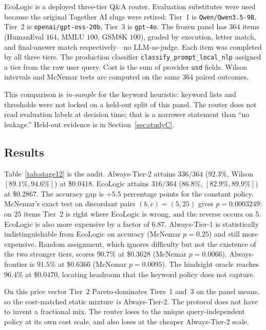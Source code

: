 \documentclass[a4paper,twoside]{article}
\begin{document}
EcoLogic is a deployed three-tier Q\&A router. Evaluation substitutes were used because the original Together AI slugs were retired: Tier~1 is \texttt{Qwen/Qwen3.5-9B}, Tier~2 is \texttt{openai/gpt-oss-20b}, Tier~3 is \texttt{gpt-4o}. The frozen panel has $364$ items (HumanEval $164$, MMLU $100$, GSM8K $100$), graded by execution, letter match, and final-answer match respectively---no LLM-as-judge. Each item was completed by all three tiers. The production classifier \texttt{classify\_prompt\_local\_nlp} assigned a tier from the raw user query. Cost is the sum of provider \texttt{usd} fields. Wilson intervals and McNemar tests are computed on the same $364$ paired outcomes.

This comparison is \emph{in-sample} for the keyword heuristic: keyword lists and thresholds were not locked on a held-out split of this panel. The router does not read evaluation labels at decision time; that is a narrower statement than ``no leakage.'' Held-out evidence is in Section~\ref{sec:studyC}.

\subsection{Results}

Table~\ref{tab:stage12} is the audit. Always-Tier-2 attains $336/364$ ($92.3\%$, Wilson $[89.1\%, 94.6\%]$) at \$0.0418. EcoLogic attains $316/364$ ($86.8\%$, $[82.9\%, 89.9\%]$) at \$0.2867. The accuracy gap is $+5.5$ percentage points for the constant policy. McNemar's exact test on discordant pairs $(b,c)=(5,25)$ gives $p=0.0003249$: on $25$ items Tier~2 is right where EcoLogic is wrong, and the reverse occurs on $5$. EcoLogic is also more expensive by a factor of $6.87$. Always-Tier-1 is statistically indistinguishable from EcoLogic on accuracy (McNemar $p=0.25$) and still more expensive. Random assignment, which ignores difficulty but not the existence of the two stronger tiers, scores $90.7\%$ at \$0.3628 (McNemar $p=0.0066$). Always-frontier is $91.5\%$ at \$0.6366 (McNemar $p=0.0095$). The hindsight oracle reaches $96.4\%$ at \$0.0470, locating headroom that the keyword policy does not capture.

On this price vector Tier~2 Pareto-dominates Tiers~1 and~3 on the panel means, so the cost-matched static mixture \emph{is} Always-Tier-2. The protocol does not have to invent a fractional mix. The router loses to the unique query-independent policy at its own cost scale, and also loses at the cheaper Always-Tier-2 scale.
\end{document}
